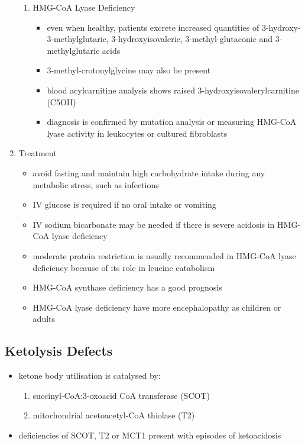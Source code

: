 \documentclass{scrartcl}
\begin{document}
\begin{enumerate}
\begin{enumerate}
\item HMG-CoA Lyase Deficiency
\label{sec:org3ff3fa5}
\begin{itemize}
\item even when healthy, patients excrete increased quantities of
3-hydroxy-3-methylglutaric, 3-hydroxyisovaleric, 3-methyl-glutaconic
and 3-methylglutaric acids
\item 3-methyl-crotonylglycine may also be present
\item blood acylcarnitine analysis shows raised
3-hydroxyisovalerylcarnitine (C5OH)
\item diagnosis is confirmed by mutation analysis or measuring HMG-CoA
lyase activity in leukocytes or cultured fibroblasts
\end{itemize}
\end{enumerate}

\item Treatment
\label{sec:orgb751472}
\begin{itemize}
\item avoid fasting and maintain  high carbohydrate intake during any
metabolic stress, such as infections
\item IV glucose is required if no oral intake or vomiting
\item IV sodium bicarbonate may be needed if there is severe acidosis in
HMG-CoA lyase deficiency
\item moderate protein restriction is usually recommended in HMG-CoA
lyase deficiency because of its role in leucine catabolism
\item HMG-CoA synthase deficiency has a good prognosis
\item HMG-CoA lyase deficiency have more encephalopathy as children or adults
\end{itemize}
\end{enumerate}

\subsection{Ketolysis Defects}
\label{sec:org36afa92}
\begin{itemize}
\item ketone body utilisation is catalysed by:
\begin{enumerate}
\item succinyl-CoA:3-oxoacid CoA transferase (SCOT)
\item mitochondrial acetoacetyl-CoA thiolase (T2)
\end{enumerate}
\item deficiencies of SCOT, T2 or MCT1 present with episodes of ketoacidosis
\end{itemize}
\end{document}
